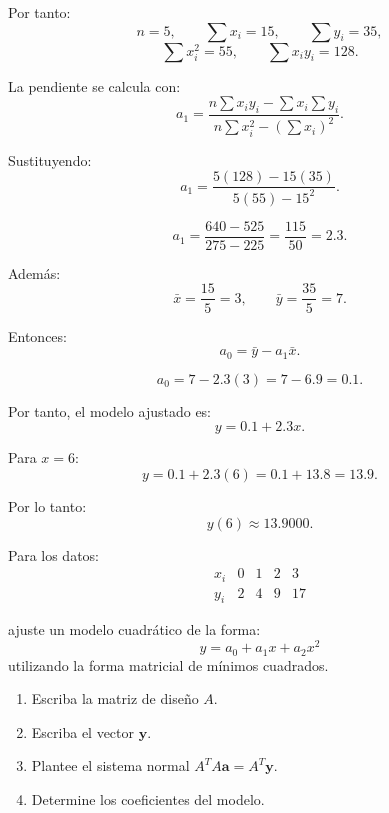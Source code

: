 \documentclass[11pt,respuestas,a4]{aleph-examen}
\begin{document}
\begin{preguntas}
\begin{respuesta}
Por tanto:
\[
n=5,
\qquad
\sum x_i=15,
\qquad
\sum y_i=35,
\]
\[
\sum x_i^2=55,
\qquad
\sum x_iy_i=128.
\]

La pendiente se calcula con:
\[
a_1=\frac{n\sum x_iy_i-\sum x_i\sum y_i}{n\sum x_i^2-(\sum x_i)^2}.
\]

Sustituyendo:
\[
a_1=\frac{5(128)-15(35)}{5(55)-15^2}.
\]

\[
a_1=\frac{640-525}{275-225}
=\frac{115}{50}=2.3.
\]

Además:
\[
\bar{x}=\frac{15}{5}=3,
\qquad
\bar{y}=\frac{35}{5}=7.
\]

Entonces:
\[
a_0=\bar{y}-a_1\bar{x}.
\]

\[
a_0=7-2.3(3)=7-6.9=0.1.
\]

Por tanto, el modelo ajustado es:
\[
\boxed{y=0.1+2.3x}.
\]

Para $x=6$:
\[
y=0.1+2.3(6)=0.1+13.8=13.9.
\]

Por lo tanto:
\[
\boxed{y(6)\approx 13.9000}.
\]
\end{respuesta}


\item
Para los datos: 
\[
\begin{array}{c|cccc}
x_i & 0 & 1 & 2 & 3 \\
\hline
y_i & 2 & 4 & 9 & 17
\end{array}
\]

ajuste un modelo cuadrático de la forma:
\[
y=a_0+a_1x+a_2x^2
\]
utilizando la forma matricial de mínimos cuadrados.

\begin{enumerate}[label=\alph*)]
    \item Escriba la matriz de diseño $A$.
    \item Escriba el vector $\mathbf{y}$.
    \item Plantee el sistema normal $A^TA\mathbf{a}=A^T\mathbf{y}$.
    \item Determine los coeficientes del modelo.
\end{enumerate}


\end{preguntas}
\end{document}
